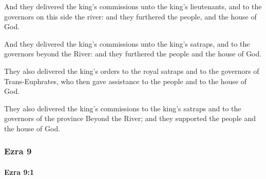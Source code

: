 			And they delivered the king’s commissions unto the king’s lieutenants, and to the governors on this side the river: and they furthered the people, and the house of God.

			\begin{versebox}
					\item[BHS] 
					\item[LXX] 
					\item[ASV] And they delivered the king's commissions unto the king's satraps, and to the governors beyond the River: and they furthered the people and the house of God.
					\item[NIV] They also delivered the king’s orders to the royal satraps and to the governors of Trans-Euphrates, who then gave assistance to the people and to the house of God.
					\item[NRSV] They also delivered the king’s commissions to the king’s satraps and to the governors of the province Beyond the River; and they supported the people and the house of God.
			\end{versebox}
	\subsubsection{Ezra 9} %
		\label{EZRA-9}

		\paragraph{Ezra 9:1} %
			\label{EZRA-9-1}

